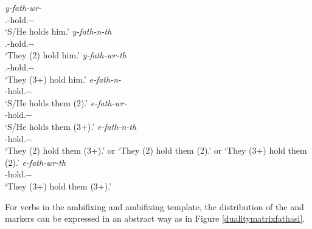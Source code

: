 \begin{exe}
\ex
\begin{xlist}
	\ex
	\gll \emph{y-fath-wr-\Zero}\\
	\Tsg.\Masc-hold.\Ext-\Ndu-\Stsg\\
	\trans `S/He holds him.'
	\label{ex215}
	\ex
	\gll \emph{y-fath-n-th}\\
	\Tsg.\Masc-hold.\Ext-\Du-\Stnsg\\
	\trans `They (2) hold him.'
	\label{ex216}
	\ex
	\gll \emph{y-fath-wr-th}\\
	\Tsg.\Masc-hold.\Ext-\Ndu-\Stnsg\\
	\trans `They (3+) hold him.'
	\label{ex217}
	\ex
	\gll \emph{e-fath-n-\Zero}\\
	\Stnsg-hold.\Ext-\Du-\Stsg\\
	\trans `S/He holds them (2).'
	\label{ex218}
	\ex
	\gll \emph{e-fath-wr-\Zero}\\
	\Stnsg-hold.\Ext-\Ndu-\Stsg\\
	\trans `S/He holds them (3+).'
	\label{ex221}
	\ex
	\gll \emph{e-fath-n-th}\\
	\Stnsg-hold.\Ext-\Du-\Stnsg\\
	\trans `They (2) hold them (3+).' or `They (2) hold them (2).' or `They (3+) hold them (2).'
	\label{ex219}
	\ex
	\gll \emph{e-fath-wr-th}\\
	\Stnsg-hold.\Ext-\Ndu-\Stnsg\\
	\trans `They (3+) hold them (3+).'
	\label{ex220}
\end{xlist}
\end{exe}

For verbs in the  ambifixing and  ambifixing template, the distribution of the  and  markers can be expressed in an abstract way as in Figure \ref{dualitymatrixfathasi}.

